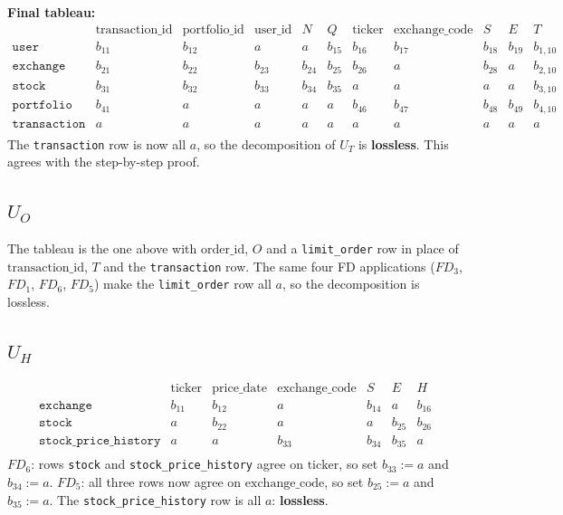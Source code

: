\documentclass{article}
\newcommand{\at}[1]{\text{#1}}
\begin{document}
\textbf{Final tableau:}
\[
\begin{array}{l|cccccccccc}
  & \at{transaction\_id} & \at{portfolio\_id} & \at{user\_id} & N & Q & \at{ticker} & \at{exchange\_code} & S & E & T \\
  \hline
  \texttt{user}        & b_{11} & b_{12} & a      & a      & b_{15} & b_{16} & b_{17} & b_{18} & b_{19} & b_{1,10} \\
  \texttt{exchange}    & b_{21} & b_{22} & b_{23} & b_{24} & b_{25} & b_{26} & a      & b_{28} & a      & b_{2,10} \\
  \texttt{stock}       & b_{31} & b_{32} & b_{33} & b_{34} & b_{35} & a      & a      & a      & a      & b_{3,10} \\
  \texttt{portfolio}   & b_{41} & a      & a      & a      & a      & b_{46} & b_{47} & b_{48} & b_{49} & b_{4,10} \\
  \texttt{transaction} & a      & a      & a      & a      & a      & a      & a      & a      & a      & a      \\
\end{array}
\]
The \texttt{transaction} row is now all $a$, so the decomposition of $U_T$ is \textbf{lossless}. This agrees with the step-by-step proof.

\subsection{$U_O$}

The tableau is the one above with $\at{order\_id}$, $O$ and a \texttt{limit\_order} row in place of $\at{transaction\_id}$, $T$ and the \texttt{transaction} row. The same four FD applications ($FD_3$, $FD_1$, $FD_6$, $FD_5$) make the \texttt{limit\_order} row all $a$, so the decomposition is lossless.

\subsection{$U_H$}

\[
\begin{array}{l|cccccc}
  & \at{ticker} & \at{price\_date} & \at{exchange\_code} & S & E & H \\
  \hline
  \texttt{exchange}            & b_{11} & b_{12} & a      & b_{14} & a      & b_{16} \\
  \texttt{stock}               & a      & b_{22} & a      & a      & b_{25} & b_{26} \\
  \texttt{stock\_price\_history} & a      & a      & b_{33} & b_{34} & b_{35} & a      \\
\end{array}
\]
$FD_6$: rows \texttt{stock} and \texttt{stock\_price\_history} agree on $\at{ticker}$, so set $b_{33} := a$ and $b_{34} := a$. $FD_5$: all three rows now agree on $\at{exchange\_code}$, so set $b_{25} := a$ and $b_{35} := a$. The \texttt{stock\_price\_history} row is all $a$: \textbf{lossless}.
\end{document}
